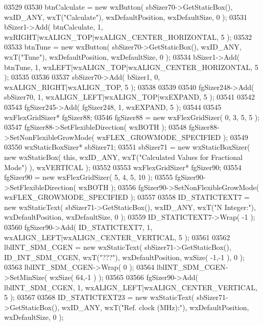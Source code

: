 \begin{DoxyCode}
03529     
03530     btnCalculate = \textcolor{keyword}{new} wxButton( sbSizer70->GetStaticBox(), wxID\_ANY, wxT(\textcolor{stringliteral}{"Calculate"}), wxDefaultPosition, 
      wxDefaultSize, 0 );
03531     bSizer1->Add( btnCalculate, 1, wxRIGHT|wxALIGN\_TOP|wxALIGN\_CENTER\_HORIZONTAL, 5 );
03532     
03533     btnTune = \textcolor{keyword}{new} wxButton( sbSizer70->GetStaticBox(), wxID\_ANY, wxT(\textcolor{stringliteral}{"Tune"}), wxDefaultPosition, 
      wxDefaultSize, 0 );
03534     bSizer1->Add( btnTune, 1, wxLEFT|wxALIGN\_TOP|wxALIGN\_CENTER\_HORIZONTAL, 5 );
03535     
03536     
03537     sbSizer70->Add( bSizer1, 0, wxALIGN\_RIGHT|wxALIGN\_TOP, 5 );
03538     
03539     
03540     fgSizer248->Add( sbSizer70, 1, wxALIGN\_LEFT|wxALIGN\_TOP|wxEXPAND, 5 );
03541     
03542     
03543     fgSizer245->Add( fgSizer248, 1, wxEXPAND, 5 );
03544     
03545     wxFlexGridSizer* fgSizer88;
03546     fgSizer88 = \textcolor{keyword}{new} wxFlexGridSizer( 0, 3, 5, 5 );
03547     fgSizer88->SetFlexibleDirection( wxBOTH );
03548     fgSizer88->SetNonFlexibleGrowMode( wxFLEX\_GROWMODE\_SPECIFIED );
03549     
03550     wxStaticBoxSizer* sbSizer71;
03551     sbSizer71 = \textcolor{keyword}{new} wxStaticBoxSizer( \textcolor{keyword}{new} wxStaticBox( \textcolor{keyword}{this}, wxID\_ANY, wxT(\textcolor{stringliteral}{"Calculated Values for
       Fractional Mode"}) ), wxVERTICAL );
03552     
03553     wxFlexGridSizer* fgSizer90;
03554     fgSizer90 = \textcolor{keyword}{new} wxFlexGridSizer( 5, 4, 5, 10 );
03555     fgSizer90->SetFlexibleDirection( wxBOTH );
03556     fgSizer90->SetNonFlexibleGrowMode( wxFLEX\_GROWMODE\_SPECIFIED );
03557     
03558     ID_STATICTEXT7 = \textcolor{keyword}{new} wxStaticText( sbSizer71->GetStaticBox(), wxID\_ANY, wxT(\textcolor{stringliteral}{"N Integer:"}), 
      wxDefaultPosition, wxDefaultSize, 0 );
03559     ID_STATICTEXT7->Wrap( -1 );
03560     fgSizer90->Add( ID_STATICTEXT7, 1, wxALIGN\_LEFT|wxALIGN\_CENTER\_VERTICAL, 5 );
03561     
03562     lblINT_SDM_CGEN = \textcolor{keyword}{new} wxStaticText( sbSizer71->GetStaticBox(), 
      ID_INT_SDM_CGEN, wxT(\textcolor{stringliteral}{"???"}), wxDefaultPosition, wxSize( -1,-1 ), 0 );
03563     lblINT_SDM_CGEN->Wrap( 0 );
03564     lblINT_SDM_CGEN->SetMinSize( wxSize( 64,-1 ) );
03565     
03566     fgSizer90->Add( lblINT_SDM_CGEN, 1, wxALIGN\_LEFT|wxALIGN\_CENTER\_VERTICAL, 5 );
03567     
03568     ID_STATICTEXT23 = \textcolor{keyword}{new} wxStaticText( sbSizer71->GetStaticBox(), wxID\_ANY, wxT(\textcolor{stringliteral}{"Ref. clock (MHz):"}), 
      wxDefaultPosition, wxDefaultSize, 0 );

\end{DoxyCode}

